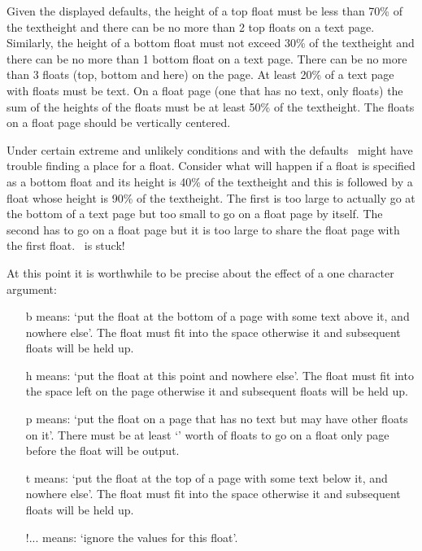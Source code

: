     Given the displayed defaults, the height of a top float must be 
less than 70\% of the textheight and there can be no more than 2 top 
floats
on a text page. Similarly, the height of a bottom float must not
exceed 30\% of the textheight and there can be no more than 1 bottom
float on a text page. There can be no more than 
3 floats (top, bottom and here)
on the page. At least 20\% of a text page with floats must be text.
On a float page (one that has no text, only floats) 
the sum of the heights
of the floats must be at least 50\% of the textheight. The floats on a float
page should be vertically centered.

    Under certain extreme and unlikely conditions and with the defaults
\ltx\ might have trouble finding a place for a float. 
Consider what will happen if a float is specified as a bottom float and
its height is 40\% of the textheight and this is followed by a float whose
height is 90\% of the textheight. The first is too large to actually 
go at the bottom of a text page but too small to go on a float page by 
itself. The second has to go on a float page but it is too large to share 
the float page with the first float. \ltx\ is stuck!

    At this point it is worthwhile to be precise about the effect of a
 one character  argument:
\begin{itemize}
\item[\textsf{b}\ixposarg{b}] means: 
      `put the float at the bottom of a page with some
      text above it, and nowhere else'. 
      The float must fit into the \cmd{\bottomfraction} space 
      otherwise it and subsequent floats will be held up.
\item[\textsf{h}\ixposarg{h}] means: 
      `put the float at this point and nowhere else'. 
      The float must fit into the space left on the page 
      otherwise it and subsequent floats will be held up.
\item[\textsf{p}\ixposarg{p}] means: 
      `put the float on a page that has no text but may
      have other floats on it'. 
      There must be at least `\cmd{\floatpagefraction}' worth of 
      floats to go on a float only page before the float will be output.
\item[\textsf{t}\ixposarg{t}] means: 
      `put the float at the top of a page with some
      text below it, and nowhere else'. 
      The float must fit into the \cmd{\topfraction} space 
      otherwise it and subsequent floats will be held up.
\item[\textsf{!...}] means: 
      `ignore the  values for this float'.
\end{itemize}

